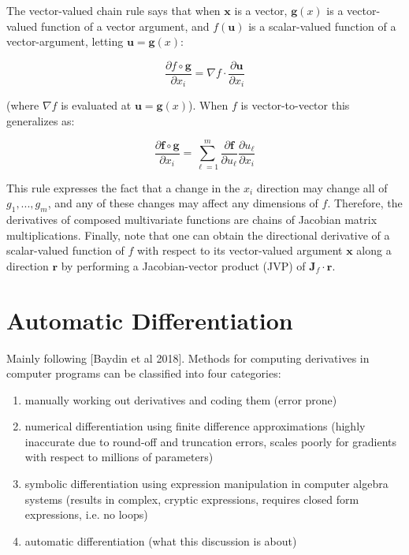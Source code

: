\documentclass[11pt]{article}
\theoremstyle{definition}
\theoremstyle{plain}
\renewcommand{\v}[1]{\mathbf{#1}}
\begin{document}
\noindent The vector-valued chain rule says that when
$\v{x}$ is a vector, $\v{g}(x)$ is a vector-valued function of a vector argument, and
$f(\v{u})$ is a scalar-valued function of a vector-argument, letting $\v{u}=\v{g}(x)$:

$$ \frac{\partial f \circ \v{g}}{\partial x_i} = 
\nabla f  \cdot \frac{\partial \v{u}}{\partial x_i} $$

\noindent (where $\nabla f$ is evaluated at $\v{u}=\v{g}(x)$). 
When $f$ is vector-to-vector this generalizes as:

$$ \frac{\partial \v{f} \circ \v{g}}{\partial x_i} = 
\sum_{\ell=1}^m \frac{\partial \v{f}}{\partial u_\ell}
\frac{\partial u_\ell}{\partial x_i} $$

\noindent This rule expresses the fact that a change in the $x_i$ 
direction may change all of $g_1,...,g_m$, and any of these changes may affect any
dimensions of $f$. Therefore, the derivatives of composed multivariate functions 
are chains of Jacobian matrix multiplications. Finally, note that one can obtain the directional
derivative of a scalar-valued function of $f$ with respect to its vector-valued argument
$\v{x}$ along a direction $\v{r}$ by performing a Jacobian-vector product (JVP) of
$\v{J}_f \cdot \v{r}$.

\newpage

\section{Automatic Differentiation}

\noindent Mainly following [Baydin et al 2018].
Methods for computing derivatives in computer programs can be classified into four categories:

\begin{enumerate}
    \item manually working out derivatives and coding them (error prone)
    \item numerical differentiation using finite difference approximations
          (highly inaccurate due to round-off and truncation errors, scales
          poorly for gradients with respect to millions of parameters)
    \item symbolic differentiation using expression manipulation in 
          computer algebra systems (results in complex, cryptic expressions,
          requires closed form expressions, i.e. no loops) 
    \item automatic differentiation (what this discussion is about)
\end{enumerate}
\end{document}
